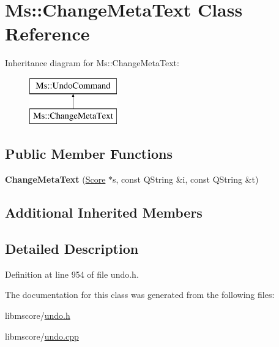 \hypertarget{class_ms_1_1_change_meta_text}{}\section{Ms\+:\+:Change\+Meta\+Text Class Reference}
\label{class_ms_1_1_change_meta_text}
Inheritance diagram for Ms\+:\+:Change\+Meta\+Text\+:\begin{figure}[H]
\begin{center}
\leavevmode
\includegraphics[height=2.000000cm]{class_ms_1_1_change_meta_text}
\end{center}
\end{figure}
\subsection*{Public Member Functions}
\begin{DoxyCompactItemize}
\item 
\mbox{\label{class_ms_1_1_change_meta_text_abe6d69387a7257e57dd6c2167df2bada}} 
{\bfseries Change\+Meta\+Text} (\hyperlink{class_ms_1_1_score}{Score} $\ast$s, const Q\+String \&i, const Q\+String \&t)
\end{DoxyCompactItemize}
\subsection*{Additional Inherited Members}


\subsection{Detailed Description}


Definition at line 954 of file undo.\+h.



The documentation for this class was generated from the following files\+:\begin{DoxyCompactItemize}
\item 
libmscore/\hyperlink{undo_8h}{undo.\+h}\item 
libmscore/\hyperlink{undo_8cpp}{undo.\+cpp}\end{DoxyCompactItemize}
